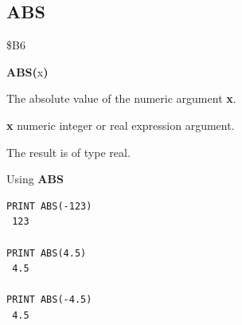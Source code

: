 \subsection{ABS}
\begin{description}[leftmargin=2cm,style=nextline]
\item [Token:]    \$B6

\item [Format:]   {\bf ABS(}x{\bf)}

\item [Returns:]  The absolute value of the numeric argument {\bf x}.

                  {\bf x} numeric integer or real expression argument.

\item [Remarks:]  The result is of type real.

\item [Examples:] Using {\bf ABS}

\begin{tcolorbox}[colback=black,coltext=white]
\verbatimfont{\codefont}
\begin{verbatim}
PRINT ABS(-123)
 123

PRINT ABS(4.5)
 4.5

PRINT ABS(-4.5)
 4.5
\end{verbatim}
\end{tcolorbox}
\end{description}


\newpage
